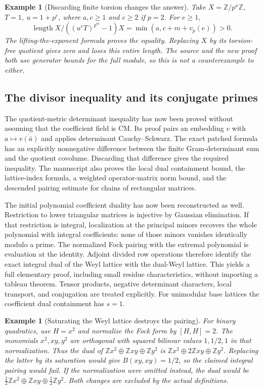 \documentclass[11pt,a4paper]{article}
\newtheorem{example}[proposition]{Example}
\theoremstyle{remark}
\newcommand{\Z}{\mathbb Z}
\DeclareMathOperator{\length}{length}
\begin{document}
\begin{example}[Discarding finite torsion changes the answer]
Take $X=\Z/p^a\Z$, $T=1$, $u=1+p^c$, where $a,c\ge1$ and
$c\ge2$ if $p=2$. For $e\ge1$,
\[
 \length X/((u^eT)^{p^m}-1)X
                  =\min(a,c+m+v_p(e))>0.
\]
The lifting-the-exponent formula proves the equality. Replacing
$X$ by its torsion-free quotient gives zero and loses this entire
length. The source and the new proof both use generator bounds
for the full module, so this is not a counterexample to either.
\end{example}

\subsection{The divisor inequality and its conjugate primes}

The quotient-metric determinant inequality has now been proved
without assuming that the coefficient field is CM. Its proof
pairs an embedding $v$ with
$a\mapsto\overline{v(\bar a)}$ and applies determinant
Cauchy--Schwarz. The exact patched formula has an explicitly
nonnegative difference between the finite Gram-determinant sum
and the quotient covolume. Discarding that difference gives the
required inequality. The manuscript also proves the local dual
containment bound, the lattice-index formula, a weighted
operator-matrix norm bound, and the descended pairing estimate
for chains of rectangular matrices.

The initial polynomial coefficient duality has now been
reconstructed as well. Restriction to lower triangular matrices
is injective by Gaussian elimination. If that restriction is
integral, localization at the principal minors recovers the
whole polynomial with integral coefficients: none of those
minors vanishes identically modulo a prime. The normalized
Fock pairing with the extremal polynomial is evaluation at
the identity. Adjoint divided row operations therefore identify
the exact integral dual of the Weyl lattice with the dual-Weyl
lattice. This yields a full elementary proof, including small
residue characteristics, without importing a tableau theorem.
Tensor products, negative determinant characters, local
transport, and conjugation are treated explicitly. For
unimodular base lattices the coefficient dual containment has
$s=1$.

\begin{example}[Saturating the Weyl lattice destroys the pairing]
For binary quadratics, use $H=x^2$ and normalize the Fock form
by $[H,H]=2$. The monomials $x^2,xy,y^2$ are orthogonal
with squared bilinear values $1,1/2,1$ in that normalization.
Thus the dual of
$\Z x^2\oplus\Z xy\oplus\Z y^2$ is
$\Z x^2\oplus2\Z xy\oplus\Z y^2$.
Replacing the latter by its saturation would give
$B(xy,xy)=1/2$, so the claimed integral pairing would fail.
If the normalization were omitted instead, the dual would be
$\tfrac12\Z x^2\oplus\Z xy\oplus\tfrac12\Z y^2$.
Both changes are excluded by the actual definitions.
\end{example}
\end{document}
